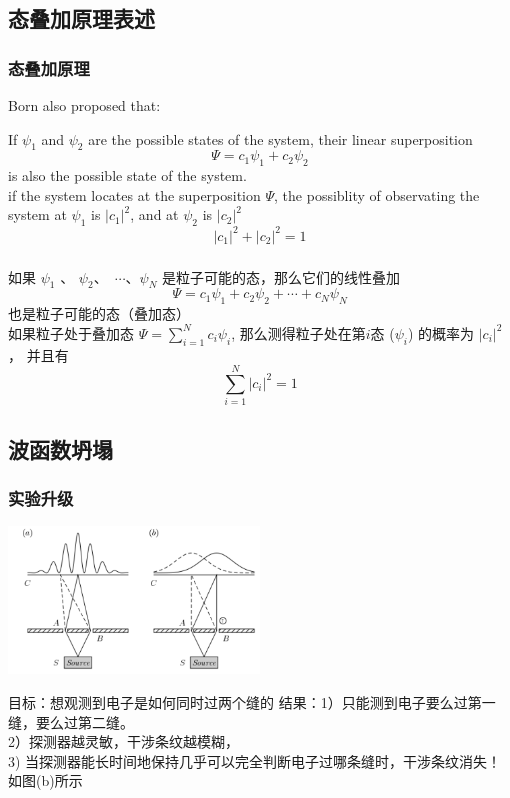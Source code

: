 \subsection{态叠加原理表述}

\begin{frame}
    \frametitle{态叠加原理}
    Born also proposed that: \\
    \begin{tcolorbox4}
    If $\psi_1$ and $\psi_2$ are the possible states of the system,
    their linear superposition \[ \Psi=c_1 \psi_1+ c_2\psi_2 \]
    is also the possible state of the system.\\
    if the system locates at the superposition $\Psi$, the possiblity of observating the system at $\psi_1$ is $|c_1|^2$, and at $\psi_2$ is $|c_2|^2$ \\
    \[|c_1 |^2 + |c_2 |^2 =1\]
    \end{tcolorbox4}
\end{frame}

\begin{frame}
    \frametitle{}
    \begin{tcolorbox4}[态叠加原理中文表述]
    如果 $\psi_1$ 、 $\psi_2$、 $\cdots$、$\psi_N$ 是粒子可能的态，那么它们的线性叠加
        $$ \Psi=c_1 \psi_1+ c_2\psi_2+\cdots+c_N\psi_N $$
    也是粒子可能的态（叠加态）\\   
    如果粒子处于叠加态 $\Psi=\sum\limits_{i=1}^N c_i \psi_i$,  
    那么测得粒子处在第$i$态 ($\psi_i$) 的概率为 $|c_i |^2$， 
    并且有  $$\sum_{i=1}^{N} |c_i|^2 =1$$
    \end{tcolorbox4}
\end{frame}

\subsection{波函数坍塌}

\begin{frame}
    \frametitle{实验升级}
    \begin{center}
        \includegraphics[width=0.5\textwidth]{figs/sup-4.png} \\
    \end{center} 
    \begin{itemize}
        \Item 目标：想观测到电子是如何同时过两个缝的
        \Item 结果：1）只能测到电子要么过第一缝，要么过第二缝。\\
        2）探测器越灵敏，干涉条纹越模糊，\\
        3) 当探测器能长时间地保持几乎可以完全判断电子过哪条缝时，干涉条纹消失！如图(b)所示
    \end{itemize}
\end{frame}

